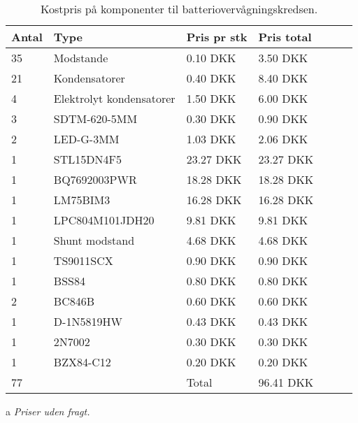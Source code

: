 \FloatBlock



\begin{table}[h!]
	\small
	\centering
	\begin{threeparttable}
		\begin{tabular}{ l l l l l l l }
			\toprule
			\multicolumn{1}{l}{\textbf{Antal}}        &
			\multicolumn{1}{l}{\textbf{Type}}         &
			\multicolumn{1}{l}{\textbf{Pris pr stk}}  &
			\multicolumn{1}{l}{\textbf{Pris total}}   \\ 
			\hline
			35 &  Modstande                 &  0.10 DKK   &  3.50 DKK  \\
			21 &  Kondensatorer             &  0.40 DKK   &  8.40 DKK  \\
			4  &  Elektrolyt kondensatorer  &  1.50 DKK   &  6.00 DKK  \\
			3  &  SDTM-620-5MM              &  0.30 DKK   &  0.90 DKK  \\
			2  &  LED-G-3MM                 &  1.03 DKK   &  2.06 DKK  \\
			1  &  STL15DN4F5                & 23.27 DKK   & 23.27 DKK  \\
			1  &  BQ7692003PWR              & 18.28 DKK   & 18.28 DKK  \\
			1  &  LM75BIM3                  & 16.28 DKK   & 16.28 DKK  \\
			1  &  LPC804M101JDH20           &  9.81 DKK   &  9.81 DKK  \\
			1  &  Shunt modstand            &  4.68 DKK   &  4.68 DKK  \\
			1  &  TS9011SCX                 &  0.90 DKK   &  0.90 DKK  \\
			1  &  BSS84                     &  0.80 DKK   &  0.80 DKK  \\
			2  &  BC846B                    &  0.60 DKK   &  0.60 DKK  \\
			1  &  D-1N5819HW                &  0.43 DKK   &  0.43 DKK  \\
			1  &  2N7002                    &  0.30 DKK   &  0.30 DKK  \\
			1  &  BZX84-C12                 &  0.20 DKK   &  0.20 DKK  \\  
			\hline
		   77  &                            & Total       & 96.41 DKK  \\  
			\hline
			\bottomrule
		\end{tabular}
		\begin{tablenotes}
			\item[a] \textit{Priser uden fragt.}
		\end{tablenotes}
		\caption{Kostpris på komponenter til batteriovervågningskredsen.}
		\label{tab:pris_ic}
	\end{threeparttable}
\end{table} 
\FloatBlock

